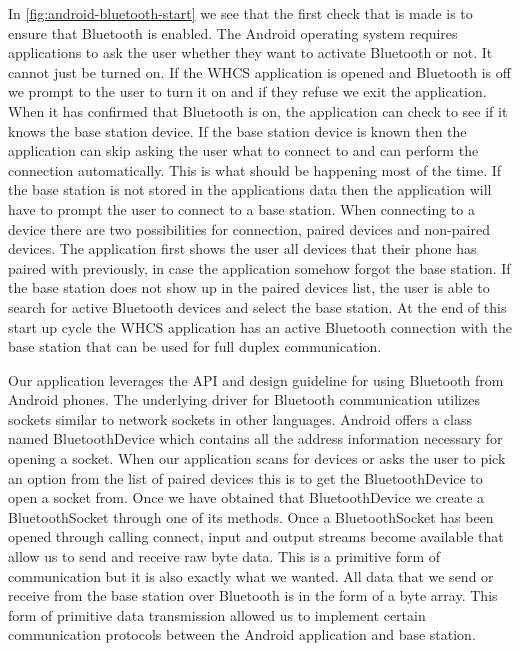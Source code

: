 
In \autoref{fig:android-bluetooth-start} we see that the first check that is
made is to ensure that Bluetooth is enabled. The Android operating system
requires applications to ask the user whether they want to activate Bluetooth
or not. It cannot just be turned on. If the WHCS application is opened and
Bluetooth is off we prompt to the user to turn it on and if they refuse we
exit the application. When it has confirmed that Bluetooth is on, the
application can check to see if it knows the base station device. If the base
station device is known then the application can skip asking the user what to
connect to and can perform the connection automatically. This is what should be
happening most of the time. If the base station is not stored in the
applications data then the application will have to prompt the user to connect
to a base station. When connecting to a device there are two possibilities for
connection, paired devices and non{}-paired devices. The application first
shows the user all devices that their phone has paired with previously, in case
the application somehow forgot the base station. If the base station does not
show up in the paired devices list, the user is able to search for active
Bluetooth devices and select the base station. At the end of this start up
cycle the WHCS application has an active Bluetooth connection with the
base station that can be used for full duplex communication.

Our application leverages the API and design guideline for using
Bluetooth from Android phones. The underlying driver for Bluetooth
communication utilizes sockets similar to network sockets in other languages.
Android offers a class named BluetoothDevice which contains all the address
information necessary for opening a socket. When our application scans for
devices or asks the user to pick an option from the list of paired devices this
is to get the BluetoothDevice to open a socket from. Once we have obtained
that BluetoothDevice we create a BluetoothSocket through one of its
methods. Once a BluetoothSocket has been opened through calling connect, 
input and output streams become available that allow us to send and receive raw
byte data. This is a primitive form of communication but it is also exactly
what we wanted. All data that we send or receive from the base station over
Bluetooth is in the form of a byte array. This form of primitive data
transmission allowed us to implement certain communication protocols between the
Android application and base station.


